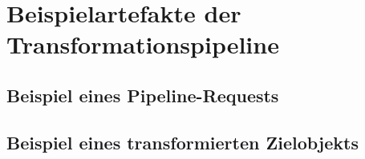 \section{Beispielartefakte der Transformationspipeline} 
\label{app:example-artifacts} 

\subsection{Beispiel eines Pipeline-Requests} 
\label{app:pipeline-request} 

 
    
\subsection{Beispiel eines transformierten Zielobjekts} 
\label{app:target-schema} 

